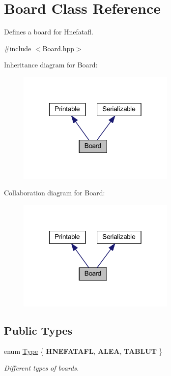 \hypertarget{class_board}{\section{Board Class Reference}
\label{class_board}
}


Defines a board for Hnefatafl.  




{\ttfamily \#include $<$Board.\-hpp$>$}



Inheritance diagram for Board\-:
\nopagebreak
\begin{figure}[H]
\begin{center}
\leavevmode
\includegraphics[width=219pt]{class_board__inherit__graph}
\end{center}
\end{figure}


Collaboration diagram for Board\-:
\nopagebreak
\begin{figure}[H]
\begin{center}
\leavevmode
\includegraphics[width=219pt]{class_board__coll__graph}
\end{center}
\end{figure}
\subsection*{Public Types}
\begin{DoxyCompactItemize}
\item 
enum \hyperlink{class_board_a7a90fdd0f301fc502684108416605644}{Type} \{ {\bfseries H\-N\-E\-F\-A\-T\-A\-F\-L}, 
{\bfseries A\-L\-E\-A}, 
{\bfseries T\-A\-B\-L\-U\-T}
 \}
\begin{DoxyCompactList}\small\item\em Different types of boards. \end{DoxyCompactList}\end{DoxyCompactItemize}
